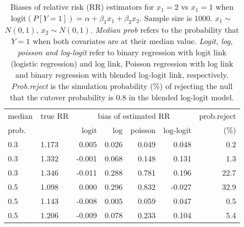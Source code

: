 \documentclass[12pt,a4paper]{article}
\begin{document}
\begin{table}[H] 
\small\sf\centering 
\caption{Biases of relative risk (RR) estimators for $x_1=2$ vs $x_1=1$ when $\mbox{logit}(P[Y=1])=\alpha+\beta_1 x_1 + \beta_2 x_2$. Sample size is 1000. $x_1 \sim $$N(0,1)$, $x_2 \sim N(0,1)$. {\it Median prob} refers to the probability that $Y=1$ when both covariates are at their median value. {\it Logit, log, poisson and log-logit} refer to binary regression with logit link (logistic regression) and log link, Poisson regression with log link and binary regression with blended log-logit link, respectively. {\it Prob.reject} is the simulation probability (\%) of rejecting the null that the cutover probability is $0.8$ in the blended log-logit model.} 
\begin{tabular}{llrrrrr} 
\toprule 
median & true RR & \multicolumn{4}{c}{bias of estimated RR} & prob.reject \\ 
prob. & & logit & log & poisson & log-logit  & (\%) \\ \midrule 
0.3 & 1.173 &  0.005 & 0.026 & 0.049 &  0.048 &  0.2 \\  
0.3 & 1.332 & -0.001 & 0.068 & 0.148 &  0.131 &  1.3 \\  
0.3 & 1.346 & -0.011 & 0.288 & 0.781 &  0.196 & 22.7 \\  
0.5 & 1.098 &  0.000 & 0.296 & 0.832 & -0.027 & 32.9 \\  
0.5 & 1.143 & -0.008 & 0.005 & 0.059 &  0.047 &  0.5 \\  
0.5 & 1.206 & -0.009 & 0.078 & 0.233 &  0.104 &  5.4 \\  
\bottomrule 
\end{tabular} 
\end{table} 
\end{document}
